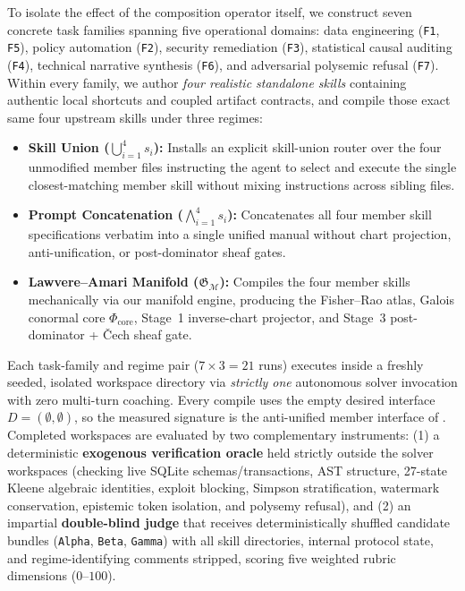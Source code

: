 \documentclass[11pt]{article}
\theoremstyle{definition}
\theoremstyle{plain}
\newcommand{\Mcal}{\mathcal{M}}
\newcommand{\Gfrak}{\mathfrak{G}}
\newcommand{\Phicore}{\Phi_{\mathrm{core}}}
\begin{document}
To isolate the effect of the composition operator itself, we construct seven concrete task families spanning five operational domains: data engineering (\texttt{F1}, \texttt{F5}), policy automation (\texttt{F2}), security remediation (\texttt{F3}), statistical causal auditing (\texttt{F4}), technical narrative synthesis (\texttt{F6}), and adversarial polysemic refusal (\texttt{F7}). Within every family, we author \emph{four realistic standalone skills} containing authentic local shortcuts and coupled artifact contracts, and compile those exact same four upstream skills under three regimes:
\begin{itemize}[leftmargin=1.6em,itemsep=1pt,topsep=2pt]
  \item \textbf{Skill Union ($\bigcup_{i=1}^4 s_i$):} Installs an explicit skill-union router over the four unmodified member files instructing the agent to select and execute the single closest-matching member skill without mixing instructions across sibling files.
  \item \textbf{Prompt Concatenation ($\bigwedge_{i=1}^4 s_i$):} Concatenates all four member skill specifications verbatim into a single unified manual without chart projection, anti-unification, or post-dominator sheaf gates.
  \item \textbf{Lawvere--Amari Manifold ($\Gfrak_{\Mcal}$):} Compiles the four member skills mechanically via our manifold engine, producing the Fisher--Rao atlas, Galois conormal core $\Phicore$, Stage~1 inverse-chart projector, and Stage~3 post-dominator + \v{C}ech sheaf gate.
\end{itemize}

Each task-family and regime pair ($7 \times 3 = 21$ runs) executes inside a freshly seeded, isolated workspace directory via \emph{strictly one} autonomous solver invocation with zero multi-turn coaching. Every compile uses the empty desired interface $D = (\emptyset, \emptyset)$, so the measured signature is the anti-unified member interface of . Completed workspaces are evaluated by two complementary instruments: (1) a deterministic \textbf{exogenous verification oracle} held strictly outside the solver workspaces (checking live SQLite schemas/transactions, AST structure, 27-state Kleene algebraic identities, exploit blocking, Simpson stratification, watermark conservation, epistemic token isolation, and polysemy refusal), and (2) an impartial \textbf{double-blind judge} \citep{zheng2023judging} that receives deterministically shuffled candidate bundles (\texttt{Alpha}, \texttt{Beta}, \texttt{Gamma}) with all skill directories, internal protocol state, and regime-identifying comments stripped, scoring five weighted rubric dimensions ($0$--$100$).
\end{document}
